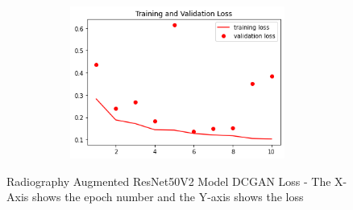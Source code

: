  \begin{figure}[H]
    \centering
    \includegraphics[width=1\textwidth,height=5cm,keepaspectratio]{Images/RadiographyCNNResNet50V2TrainAndValLossAugmentedDCGAN.png}\\
    \caption{Radiography Augmented ResNet50V2 Model DCGAN Loss - The X-Axis shows the epoch number and the Y-axis shows the loss}
    \label{fig:Radiography Augmented ResNet50V2 Model DCGAN Loss}
\end{figure}
